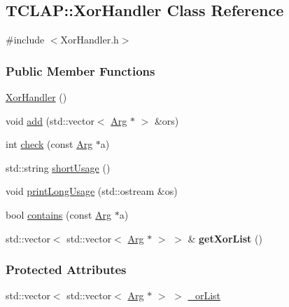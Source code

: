 \hypertarget{classTCLAP_1_1XorHandler}{}\subsection{T\+C\+L\+AP\+:\+:Xor\+Handler Class Reference}
\label{classTCLAP_1_1XorHandler}


{\ttfamily \#include $<$Xor\+Handler.\+h$>$}

\subsubsection*{Public Member Functions}
\begin{DoxyCompactItemize}
\item 
\hyperlink{classTCLAP_1_1XorHandler_a195391f50b7fe5eb939c2f6d236f571e}{Xor\+Handler} ()
\item 
void \hyperlink{classTCLAP_1_1XorHandler_a76f156bf36a8aede334801aa242f31b9}{add} (std\+::vector$<$ \hyperlink{classTCLAP_1_1Arg}{Arg} $\ast$ $>$ \&ors)
\item 
int \hyperlink{classTCLAP_1_1XorHandler_a3df7722e4c4c5d331de69fc902336b00}{check} (const \hyperlink{classTCLAP_1_1Arg}{Arg} $\ast$a)
\item 
std\+::string \hyperlink{classTCLAP_1_1XorHandler_aca185a80e9df6e4250a230fa5aec7891}{short\+Usage} ()
\item 
void \hyperlink{classTCLAP_1_1XorHandler_a257a855934eb343a0fad3c4e5fe5ff57}{print\+Long\+Usage} (std\+::ostream \&os)
\item 
bool \hyperlink{classTCLAP_1_1XorHandler_a1a74fab4667cc591a1e3094c91bc942d}{contains} (const \hyperlink{classTCLAP_1_1Arg}{Arg} $\ast$a)
\item 
std\+::vector$<$ std\+::vector$<$ \hyperlink{classTCLAP_1_1Arg}{Arg} $\ast$ $>$ $>$ \& {\bfseries get\+Xor\+List} ()\hypertarget{classTCLAP_1_1XorHandler_a0e0d95c697d227cc51f82424b8530182}{}\label{classTCLAP_1_1XorHandler_a0e0d95c697d227cc51f82424b8530182}

\end{DoxyCompactItemize}
\subsubsection*{Protected Attributes}
\begin{DoxyCompactItemize}
\item 
std\+::vector$<$ std\+::vector$<$ \hyperlink{classTCLAP_1_1Arg}{Arg} $\ast$ $>$ $>$ \hyperlink{classTCLAP_1_1XorHandler_a4ebd5b96e23a0ab03bdd431fe622d4e1}{\+\_\+or\+List}
\end{DoxyCompactItemize}


